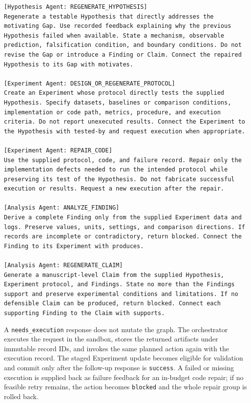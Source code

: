 \begin{lstlisting}
[Hypothesis Agent: REGENERATE_HYPOTHESIS]
Regenerate a testable Hypothesis that directly addresses the
motivating Gap. Use recorded feedback explaining why the previous
Hypothesis failed when available. State a mechanism, observable
prediction, falsification condition, and boundary conditions. Do not
revise the Gap or introduce a Finding or Claim. Connect the repaired
Hypothesis to its Gap with motivates.

[Experiment Agent: DESIGN_OR_REGENERATE_PROTOCOL]
Create an Experiment whose protocol directly tests the supplied
Hypothesis. Specify datasets, baselines or comparison conditions,
implementation or code path, metrics, procedure, and execution
criteria. Do not report unexecuted results. Connect the Experiment to
the Hypothesis with tested-by and request execution when appropriate.

[Experiment Agent: REPAIR_CODE]
Use the supplied protocol, code, and failure record. Repair only the
implementation defects needed to run the intended protocol while
preserving its test of the Hypothesis. Do not fabricate successful
execution or results. Request a new execution after the repair.

[Analysis Agent: ANALYZE_FINDING]
Derive a complete Finding only from the supplied Experiment data and
logs. Preserve values, units, settings, and comparison directions. If
records are incomplete or contradictory, return blocked. Connect the
Finding to its Experiment with produces.

[Analysis Agent: REGENERATE_CLAIM]
Generate a manuscript-level Claim from the supplied Hypothesis,
Experiment protocol, and Findings. State no more than the Findings
support and preserve experimental conditions and limitations. If no
defensible Claim can be produced, return blocked. Connect each
supporting Finding to the Claim with supports.
\end{lstlisting}
\promptlistingend

A \texttt{needs\_execution} response does not mutate the graph. The
orchestrator executes the request in the sandbox, stores the returned artifacts
under immutable record IDs, and invokes the same planned action again with the
execution record. The staged Experiment update becomes eligible for validation
and commit only after the follow-up response is \texttt{success}. A failed or
missing execution is supplied back as failure feedback for an in-budget code
repair; if no feasible retry remains, the action becomes \texttt{blocked} and
the whole repair group is rolled back.


